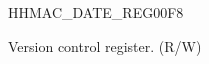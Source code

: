 \begin{register}{H}{HMAC\_DATE\_REG}{\hexprefix{}00F8}\label{regdesc:HMACDATEREG}
%
%
\regnewline%
\begin{regdesc}\begin{reglist}
\label{fielddesc:HMACDATE}\item [HMAC\_DATE] Version control register. (R/W)
\end{reglist}\end{regdesc}
\end{register}
